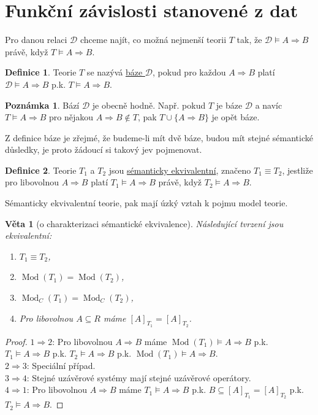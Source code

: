 \documentclass{article}
\newtheorem{theorem}{Věta}
\theoremstyle {definition}
\newtheorem{definition}{Definice}
\newtheorem*{remark}{Poznámka}
\DeclareMathOperator{\Mod}{Mod}
\begin{document}
\section {Funkční závislosti stanovené z dat}
Pro danou relaci $\mathcal D$ chceme najít, co možná nejmenší teorii
$T$ tak, že $\mathcal D\models A \Rightarrow B$ právě, když $T\models
A\Rightarrow B$.

\begin {definition}
  Teorie $T$ se nazývá \underline {báze $\mathcal D$}, pokud pro
  každou $A\Rightarrow B$ platí $\mathcal D\models A \Rightarrow B$
  p.k. $T\models A\Rightarrow B$.
\end {definition}

\begin {remark}
  Bází $\mathcal D$ je obecně hodně. Např. pokud $T$ je báze $\mathcal
  D$ a navíc $T\models A\Rightarrow B$ pro nějakou $A\Rightarrow B
  \not\in T$, pak $T\cup \{A\Rightarrow B\}$ je opět báze.
\end {remark}

Z definice báze je zřejmé, že budeme-li mít dvě báze, budou mít stejné
sémantické důsledky, je proto žádoucí si takový jev pojmenovat.

\begin {definition}
  Teorie $T_1$ a $T_2$ jsou \underline {sémanticky ekvivalentní},
  značeno $T_1\equiv T_2$, jestliže pro libovolnou $A \Rightarrow B$
  platí $T_1 \models A\Rightarrow B$ právě, když $T_2 \models
  A\Rightarrow B$.
\end {definition}

Sémanticky ekvivalentní teorie, pak mají úzký vztah k pojmu model
teorie.

\begin {theorem}[o charakterizaci sémantické ekvivalence]
  Následující tvrzení jsou ekvivalentní:
  \begin {enumerate}
  \item $T_1\equiv T_2$,
  \item $\Mod(T_1)=\Mod(T_2)$,
  \item $\Mod_C(T_1)=\Mod_C(T_2)$,
  \item Pro libovolnou $A\subseteq R$ máme $[A]_{T_1}=[A]_{T_2}$.
  \end {enumerate}
\end {theorem}
\begin {proof}
  $1\Rightarrow 2$: Pro libovolnou $A\Rightarrow B$ máme
  $\Mod(T_1)\models A\Rightarrow B$ p.k. $T_1\models A\Rightarrow B$
  p.k. $T_2\models A\Rightarrow B$ p.k. $\Mod(T_1)\models A\Rightarrow
  B$. \\

  $2\Rightarrow 3$: Speciální případ.\\

  $3\Rightarrow 4$: Stejné uzávěrové systémy mají stejné uzávěrové
  operátory.\\

  $4\Rightarrow 1$: Pro libovolnou $A\Rightarrow B$ máme $T_1\models
  A\Rightarrow B$ p.k. $B\subseteq[A]_{T_1}=[A]_{T_2}$
  p.k. $T_2\models A\Rightarrow B$.
\end {proof}
\end{document}
